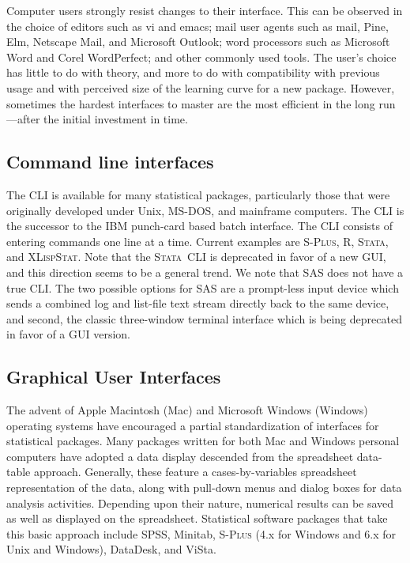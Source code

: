 \documentclass{article}
\newcommand*{\Splus}{\textsc{S-Plus}}
\newcommand*{\XLispStat}{\textsc{XLispStat}}
\newcommand*{\Stata}{\textsc{Stata}}
\begin{document}
Computer users strongly resist changes to their interface.  This can be
observed in the choice of editors such as vi and emacs; mail user agents
such as mail, Pine, Elm, Netscape Mail, and Microsoft Outlook; word
processors such as Microsoft Word and Corel WordPerfect; and other
commonly used tools.  The user's choice has little to do with theory,
and more to do with compatibility with previous usage and with
perceived size of the learning curve for a new package.
However, sometimes the hardest
interfaces to master are the most efficient in the long run---after the
initial investment in time.

\subsection{Command line interfaces}
\label{sec:UI:command}

The CLI is available for many statistical packages, particularly those
that were originally developed under Unix, MS-DOS, and mainframe
computers.  The CLI is the successor to the IBM punch-card based batch
interface.  The CLI consists of entering commands one line at a time.
Current examples are \Splus, R, \Stata, and \XLispStat.  Note that the
\Stata\ CLI is deprecated in favor of a new GUI, and this direction
seems to be a general trend.  We note that SAS does not have a true
CLI.  The two possible options for SAS are a prompt-less input device
which sends a combined log and list-file text stream directly back to
the same device, and second, the classic three-window terminal
interface which is being deprecated in favor of a GUI version.

\subsection{Graphical User Interfaces}
\label{sec:UI:GUI}

The advent of Apple Macintosh (Mac) and Microsoft Windows (Windows)
operating systems have encouraged a partial standardization of
interfaces for statistical packages.  Many packages written for both Mac
and Windows personal computers have adopted a data display descended
from the spreadsheet data-table approach.  Generally, these feature a
cases-by-variables spreadsheet representation of the data, along with
pull-down menus and dialog boxes for data analysis activities.
Depending upon their nature, numerical results can be saved as well as
displayed on the spreadsheet.  Statistical software packages that take
this basic approach include SPSS, Minitab, \Splus{} (4.x for Windows and
6.x for Unix and Windows), DataDesk, and ViSta.
\end{document}
